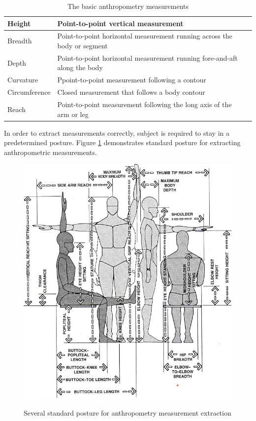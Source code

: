 \begin{table}[H]
        \centering
        \begin{tabular}{|l|m{9cm}|l|}
        \hline
        Height & Point-to-point vertical measurement\\
        \hline
        Breadth & Point-to-point horizontal measurement running across the body or segment\\
        \hline
		Depth & Point-to-point horizontal measurement running fore-and-aft along the body\\
		\hline
		Curvature & Ppoint-to-point measurement following a contour\\
		\hline
		Circumference &  Closed measurement that follows a body contour\\
		\hline
		Reach & Point-to-point measurement following the long axis of the arm or leg\\
		\hline
        \end{tabular}
        \caption{The basic anthropometry measurements}
        \label{table:tab4}
\end{table}

In order to extract measurements correctly, subject is required to stay in a predetermined posture. Figure \ref{figure:anthropo} demonstrates standard posture for extracting anthropometric measurements.

\begin{figure}[H]
    \centering
	\includegraphics[width=1\columnwidth]{../images/anthropometry_measurement}\\[1cm]
    \caption[Anthropometry measurements]{Several standard posture for anthropometry measurement extraction }
    \label{figure:anthropo}
\end{figure}

